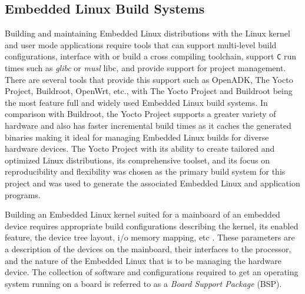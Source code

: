 \subsection{Embedded Linux Build Systems}

Building and maintaining Embedded Linux distributions with the Linux kernel and user mode applications require tools that can support multi-level build configurations, interface with or build a cross compiling toolchain, support \texttt{C} run times such as \textit{glibc} or \textit{musl} libc, and provide support for project management. There are several tools that provide this support such as OpenADK, The Yocto Project, Buildroot, OpenWrt, etc., with The Yocto Project and Buildroot being the most feature full and widely used Embedded Linux build systems. In comparison with Buildroot, the Yocto Project supports a greater variety of hardware and also has faster incremental build times as it caches the generated binaries \cite{yocto} making it ideal for managing Embedded Linux builds for diverse hardware devices. The Yocto Project with its ability to create tailored and optimized Linux distributions, its comprehensive toolset, and its focus on reproducibility and flexibility was chosen as the primary build system for this project and was used to generate the associated Embedded Linux and application programs.

Building an Embedded Linux kernel suited for a mainboard of an embedded device requires appropriate build configurations describing the kernel, its enabled feature, the device tree layout, i/o memory mapping, etc \cite{bootlin-port}. These parameters are a description of the devices on the mainboard, their interfaces to the processor, and the nature of the Embedded Linux that is to be managing the hardware device. The collection of software and configurations required to get an operating system running on a board is referred to as a \textit{Board Support Package} (BSP).

